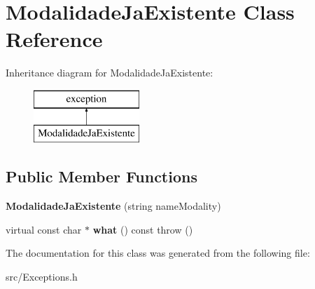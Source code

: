 \hypertarget{class_modalidade_ja_existente}{}\section{Modalidade\+Ja\+Existente Class Reference}
\label{class_modalidade_ja_existente}
Inheritance diagram for Modalidade\+Ja\+Existente\+:\begin{figure}[H]
\begin{center}
\leavevmode
\includegraphics[height=2.000000cm]{class_modalidade_ja_existente}
\end{center}
\end{figure}
\subsection*{Public Member Functions}
\begin{DoxyCompactItemize}
\item 
\hypertarget{class_modalidade_ja_existente_a543301605276ac492f9b3764499add44}{}{\bfseries Modalidade\+Ja\+Existente} (string name\+Modality)\label{class_modalidade_ja_existente_a543301605276ac492f9b3764499add44}

\item 
\hypertarget{class_modalidade_ja_existente_a645281769ee3798058a5ab34d3e8ad53}{}virtual const char $\ast$ {\bfseries what} () const   throw ()\label{class_modalidade_ja_existente_a645281769ee3798058a5ab34d3e8ad53}

\end{DoxyCompactItemize}


The documentation for this class was generated from the following file\+:\begin{DoxyCompactItemize}
\item 
src/Exceptions.\+h\end{DoxyCompactItemize}
